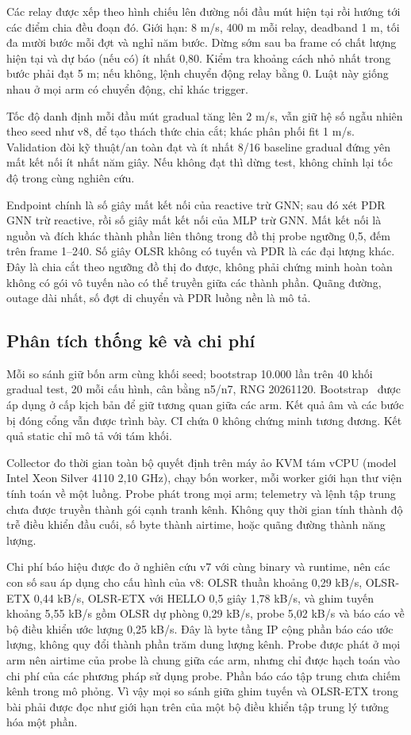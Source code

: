 Các relay được xếp theo hình chiếu lên đường nối đầu mút hiện tại rồi hướng
tới các điểm chia đều đoạn đó. Giới hạn: 8 m/s, 400 m mỗi relay, deadband
1 m, tối đa mười bước mỗi đợt và nghỉ năm bước. Dừng sớm sau ba frame có
chất lượng hiện tại và dự báo (nếu có) ít nhất 0,80. Kiểm tra khoảng cách
nhỏ nhất trong bước phải đạt 5 m; nếu không, lệnh chuyển động relay bằng 0.
Luật này giống nhau ở mọi arm có chuyển động, chỉ khác trigger.

Tốc độ danh định mỗi đầu mút gradual tăng lên 2 m/s, vẫn giữ hệ số ngẫu nhiên
theo seed như v8, để tạo thách thức chia cắt; khác phân phối fit 1 m/s.
Validation đòi kỹ thuật/an toàn đạt và ít nhất 8/16
baseline gradual đứng yên mất kết nối ít nhất năm giây. Nếu không đạt thì
dừng test, không chỉnh lại tốc độ trong cùng nghiên cứu.

Endpoint chính là số giây mất kết nối của reactive trừ GNN; sau đó xét PDR
GNN trừ reactive, rồi số giây mất kết nối của MLP trừ GNN. Mất kết nối là
nguồn và đích khác thành phần liên thông trong đồ thị probe ngưỡng 0,5, đếm
trên frame 1--240. Số giây OLSR không có tuyến và PDR là các đại lượng khác.
Đây là chia cắt theo ngưỡng đồ thị đo được, không phải chứng minh hoàn toàn
không có gói vô tuyến nào có thể truyền giữa các thành phần.
Quãng đường, outage dài nhất, số đợt di chuyển và PDR luồng nền là mô tả.

\subsection{Phân tích thống kê và chi phí}
Mỗi so sánh giữ bốn arm cùng khối seed; bootstrap 10.000 lần trên 40 khối
gradual test, 20 mỗi cấu hình, cân bằng n5/n7, RNG 20261120. Bootstrap~\cite{efron1993}
được áp dụng ở cấp kịch bản để giữ tương quan giữa các arm. Kết quả âm và
các bước bị đóng cổng vẫn được trình bày. CI chứa 0 không chứng minh tương
đương. Kết quả static chỉ mô tả với tám khối.

Collector đo thời gian toàn bộ quyết định trên máy ảo KVM tám vCPU (model
Intel Xeon Silver 4110 2,10 GHz), chạy bốn worker, mỗi worker giới hạn thư
viện tính toán về một luồng. Probe phát trong mọi arm; telemetry và lệnh tập trung chưa được
truyền thành gói cạnh tranh kênh. Không quy thời gian tính thành độ trễ điều
khiển đầu cuối, số byte thành airtime, hoặc quãng đường thành năng lượng.

Chi phí báo hiệu được đo ở nghiên cứu v7 với cùng binary và runtime, nên các
con số sau áp dụng cho cấu hình của v8: OLSR thuần khoảng 0,29 kB/s, OLSR-ETX
0,44 kB/s, OLSR-ETX với HELLO 0,5 giây 1,78 kB/s, và ghim tuyến khoảng
5,55 kB/s gồm OLSR dự phòng 0,29 kB/s, probe 5,02 kB/s và báo cáo về bộ điều
khiển ước lượng 0,25 kB/s. Đây là byte tầng IP cộng phần báo cáo ước lượng,
không quy đổi thành phần trăm dung lượng kênh. Probe được phát ở mọi arm nên
airtime của probe là chung giữa các arm, nhưng chỉ được hạch toán vào chi phí
của các phương pháp sử dụng probe. Phần báo cáo tập trung chưa chiếm kênh trong
mô phỏng. Vì vậy mọi so sánh giữa ghim tuyến và OLSR-ETX trong bài phải được
đọc như giới hạn trên của một bộ điều khiển tập trung lý tưởng hóa một phần.
